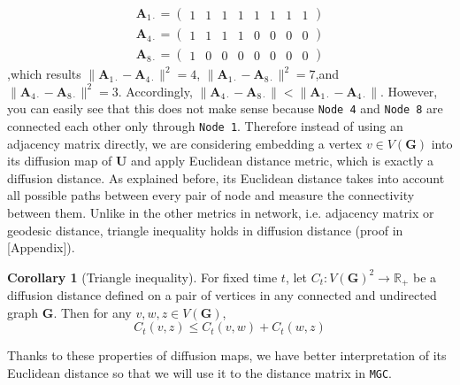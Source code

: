 \documentclass[12pt]{article}
\theoremstyle{definition}
\newtheorem{corollary}{Corollary}[theorem]
\begin{document}
\begin{equation}
	\begin{gathered}
	\boldsymbol{A}_{1 \cdot} = \left( \begin{array}{rrrrrrrr} 1 & 1 & 1 & 1 & 1 & 1 & 1 & 1 \end{array} \right) \\
	\boldsymbol{A}_{4 \cdot} = \left( \begin{array}{rrrrrrrr} 1 & 1 & 1 & 1 & 0 & 0 & 0 & 0 \end{array} \right) \\
	\boldsymbol{A}_{8 \cdot} = \left( \begin{array}{rrrrrrrr} 1 & 0 & 0 & 0 & 0 & 0 & 0 & 0 \end{array} \right)
	\end{gathered}
\end{equation}
,which results $\parallel \boldsymbol{A}_{1 \cdot} -\boldsymbol{A}_{4 \cdot} \parallel^2 = 4$, $\parallel \boldsymbol{A}_{1 \cdot} -\boldsymbol{A}_{8 \cdot} \parallel^2 = 7$,and $\parallel \boldsymbol{A}_{4 \cdot} -\boldsymbol{A}_{8 \cdot} \parallel^2 = 3.$ Accordingly, $\parallel \boldsymbol{A}_{4 \cdot} -\boldsymbol{A}_{8 \cdot} \parallel  < \parallel \boldsymbol{A}_{1 \cdot} -\boldsymbol{A}_{4 \cdot} \parallel$. However, you can easily see that this does not make sense because \texttt{Node 4} and \texttt{Node 8} are connected each other only through \texttt{Node 1}. 
Therefore instead of using an adjacency matrix directly, we are considering embedding a vertex $v \in V(\boldsymbol{G})$ into its diffusion map of $\boldsymbol{U}$ and apply Euclidean distance metric, which is exactly a diffusion distance. As explained before, its Euclidean distance takes into account all possible paths between every pair of node and measure the connectivity between them. Unlike in the other metrics in network, i.e. adjacency matrix or geodesic distance, triangle inequality holds in diffusion distance (proof in [Appendix]). 
\begin{corollary}[Triangle inequality]
	\label{corollary1}
		For fixed time $t$, let $C_{t} : V(\mathbf{G})^2 \rightarrow \mathbb{R}_{+}$ be a diffusion distance defined on a pair of vertices in any connected and undirected graph $\mathbf{G}$. Then for any $v, w, z \in V(\mathbf{G})$,  
		\begin{equation}
		C_{t}(v,z) \leq C_{t}(v,w) + C_{t}(w,z)
\end{equation}
\end{corollary}	
	
Thanks to these properties of diffusion maps, we have better interpretation of its Euclidean distance so that we will use it to the distance matrix in \texttt{MGC}.
	
\end{document}
